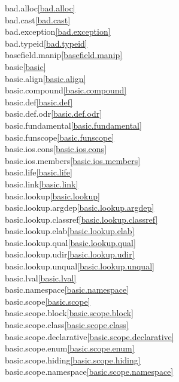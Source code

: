 \begin{multicols}{2}
bad.alloc\quad\ref{bad.alloc}\\
bad.cast\quad\ref{bad.cast}\\
bad.exception\quad\ref{bad.exception}\\
bad.typeid\quad\ref{bad.typeid}\\
basefield.manip\quad\ref{basefield.manip}\\
basic\quad\ref{basic}\\
basic.align\quad\ref{basic.align}\\
basic.compound\quad\ref{basic.compound}\\
basic.def\quad\ref{basic.def}\\
basic.def.odr\quad\ref{basic.def.odr}\\
basic.fundamental\quad\ref{basic.fundamental}\\
basic.funscope\quad\ref{basic.funscope}\\
basic.ios.cons\quad\ref{basic.ios.cons}\\
basic.ios.members\quad\ref{basic.ios.members}\\
basic.life\quad\ref{basic.life}\\
basic.link\quad\ref{basic.link}\\
basic.lookup\quad\ref{basic.lookup}\\
basic.lookup.argdep\quad\ref{basic.lookup.argdep}\\
basic.lookup.classref\quad\ref{basic.lookup.classref}\\
basic.lookup.elab\quad\ref{basic.lookup.elab}\\
basic.lookup.qual\quad\ref{basic.lookup.qual}\\
basic.lookup.udir\quad\ref{basic.lookup.udir}\\
basic.lookup.unqual\quad\ref{basic.lookup.unqual}\\
basic.lval\quad\ref{basic.lval}\\
basic.namespace\quad\ref{basic.namespace}\\
basic.scope\quad\ref{basic.scope}\\
basic.scope.block\quad\ref{basic.scope.block}\\
basic.scope.class\quad\ref{basic.scope.class}\\
basic.scope.declarative\quad\ref{basic.scope.declarative}\\
basic.scope.enum\quad\ref{basic.scope.enum}\\
basic.scope.hiding\quad\ref{basic.scope.hiding}\\
basic.scope.namespace\quad\ref{basic.scope.namespace}\\

\end{multicols}
